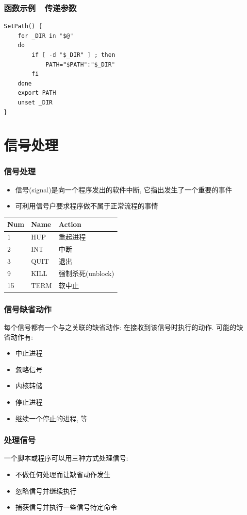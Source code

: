 \documentclass[compress]{beamer}
\begin{document}
\begin{frame}[fragile]
\frametitle{函数示例---传递参数}

\begin{lstlisting}
SetPath() {
    for _DIR in "$@"
    do
        if [ -d "$_DIR" ] ; then
            PATH="$PATH":"$_DIR"
        fi
    done
    export PATH
    unset _DIR
}
\end{lstlisting}
\end{frame}

\section{信号处理}

\begin{frame}
\frametitle{信号处理}

\begin{itemize}
\item 信号(signal)是向一个程序发出的软件中断, 它指出发生了一个重要的事件
\item 可利用信号户要求程序做不属于正常流程的事情
\end{itemize}

{\small
\begin{tabular}{p{2cm}p{2cm}p{5cm}}\hline
Num & Name & Action\\ \hline
1 & HUP & 重起进程 \\
2 & INT & 中断 \\
3 & QUIT & 退出 \\
9 & KILL & 强制杀死(unblock)\\
15 & TERM & 软中止 \\ \hline
\end{tabular}
}
\end{frame}

\begin{frame}
\frametitle{信号缺省动作}

每个信号都有一个与之关联的缺省动作: 在接收到该信号时执行的动作.
可能的缺省动作有:

\begin{itemize}
\item 中止进程
\item 忽略信号
\item 内核转储
\item 停止进程
\item 继续一个停止的进程, 等
\end{itemize}
\end{frame}

\begin{frame}
\frametitle{处理信号}

一个脚本或程序可以用三种方式处理信号:

\begin{itemize}
\item 不做任何处理而让缺省动作发生
\item 忽略信号并继续执行
\item 捕获信号并执行一些信号特定命令
\end{itemize}

\end{frame}
\end{document}
